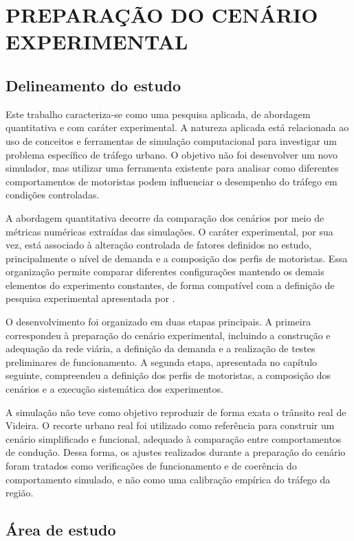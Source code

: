 \chapter{PREPARAÇÃO DO CENÁRIO EXPERIMENTAL}

\section{Delineamento do estudo}

Este trabalho caracteriza-se como uma pesquisa aplicada, de abordagem quantitativa e com caráter experimental. A natureza aplicada está relacionada ao uso de conceitos e ferramentas de simulação computacional para investigar um problema específico de tráfego urbano. O objetivo não foi desenvolver um novo simulador, mas utilizar uma ferramenta existente para analisar como diferentes comportamentos de motoristas podem influenciar o desempenho do tráfego em condições controladas.

A abordagem quantitativa decorre da comparação dos cenários por meio de métricas numéricas extraídas das simulações. O caráter experimental, por sua vez, está associado à alteração controlada de fatores definidos no estudo, principalmente o nível de demanda e a composição dos perfis de motoristas. Essa organização permite comparar diferentes configurações mantendo os demais elementos do experimento constantes, de forma compatível com a definição de pesquisa experimental apresentada por .

O desenvolvimento foi organizado em duas etapas principais. A primeira correspondeu à preparação do cenário experimental, incluindo a construção e adequação da rede viária, a definição da demanda e a realização de testes preliminares de funcionamento. A segunda etapa, apresentada no capítulo seguinte, compreendeu a definição dos perfis de motoristas, a composição dos cenários e a execução sistemática dos experimentos.

A simulação não teve como objetivo reproduzir de forma exata o trânsito real de Videira. O recorte urbano real foi utilizado como referência para construir um cenário simplificado e funcional, adequado à comparação entre comportamentos de condução. Dessa forma, os ajustes realizados durante a preparação do cenário foram tratados como verificações de funcionamento e de coerência do comportamento simulado, e não como uma calibração empírica do tráfego da região.

\section{Área de estudo}

